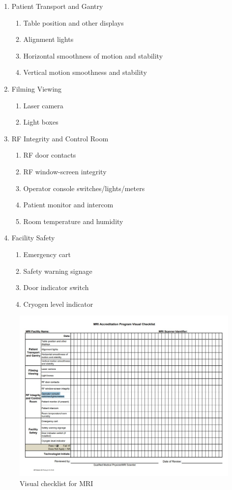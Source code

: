 \documentclass[12pt]{article}
\begin{document}
\begin{enumerate}
    \item Patient Transport and Gantry
    \begin{enumerate}
        \item Table position and other displays
        \item Alignment lights
        \item Horizontal smoothness of motion and stability
        \item Vertical motion smoothness and stability
    \end{enumerate}
    \item Filming Viewing
    \begin{enumerate}
        \item Laser camera
        \item Light boxes
    \end{enumerate}
    \item RF Integrity and Control Room
    \begin{enumerate}
        \item RF door contacts
        \item RF window-screen integrity
        \item Operator console switches/lights/meters
        \item Patient monitor and intercom
        \item Room temperature and humidity
    \end{enumerate}
    \item Facility Safety
    \begin{enumerate}
        \item Emergency cart
        \item Safety warning signage
        \item Door indicator switch
        \item Cryogen level indicator
    \end{enumerate}
\end{enumerate}
\begin{figure}[h!]
    \centering
    \includegraphics[width=0.8\linewidth]{vc.jpg}
    \caption{\small{Visual checklist for MRI}}
    \label{fig:Visual checklist for MRI}
\end{figure}
\end{document}
